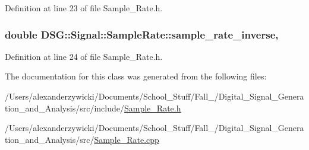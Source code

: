 Definition at line 23 of file Sample\+\_\+\+Rate.\+h.

\hypertarget{classDSG_1_1Signal_1_1SampleRate_aff4ae45050bb2179bf57a1f047f8ede6}{
\subsubsection[{sample\+\_\+rate\+\_\+inverse}]{\setlength{\rightskip}{0pt plus 5cm}double D\+S\+G\+::\+Signal\+::\+Sample\+Rate\+::sample\+\_\+rate\+\_\+inverse\hspace{0.3cm}{\ttfamily [static]}, {\ttfamily [protected]}}}\label{classDSG_1_1Signal_1_1SampleRate_aff4ae45050bb2179bf57a1f047f8ede6}


Definition at line 24 of file Sample\+\_\+\+Rate.\+h.



The documentation for this class was generated from the following files\+:\begin{DoxyCompactItemize}
\item 
/\+Users/alexanderzywicki/\+Documents/\+School\+\_\+\+Stuff/\+Fall\+\_/\+Digital\+\_\+\+Signal\+\_\+\+Generation\+\_\+and\+\_\+\+Analysis/src/include/\hyperlink{Sample__Rate_8h}{Sample\+\_\+\+Rate.\+h}\item 
/\+Users/alexanderzywicki/\+Documents/\+School\+\_\+\+Stuff/\+Fall\+\_/\+Digital\+\_\+\+Signal\+\_\+\+Generation\+\_\+and\+\_\+\+Analysis/src/\hyperlink{Sample__Rate_8cpp}{Sample\+\_\+\+Rate.\+cpp}\end{DoxyCompactItemize}
